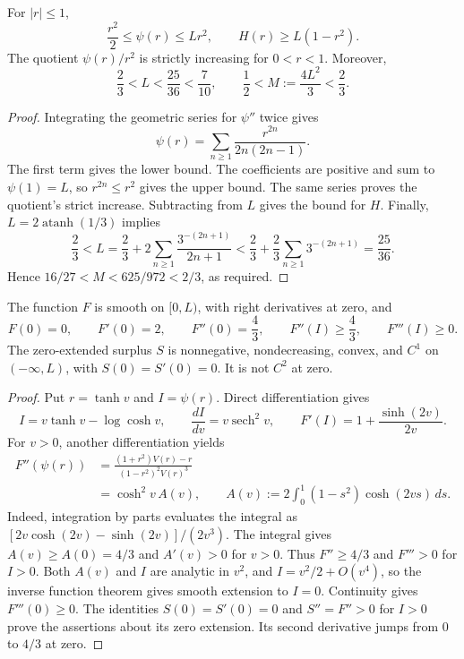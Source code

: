 \begin{lemma}
\label{scalar:entropy-bounds}
For $|r|\le1$,
\begin{equation}
\label{scalar:entropy-quadratic-bounds}
 \frac{r^2}{2}\le\psi(r)\le Lr^2,\qquad H(r)\ge L(1-r^2).
\end{equation}
The quotient $\psi(r)/r^2$ is strictly increasing for $0<r<1$.
Moreover,
\begin{equation}
\label{scalar:logarithm-constants}
 \frac23<L<\frac{25}{36}<\frac7{10},\qquad
 \frac12<M:=\frac{4L^2}{3}<\frac23.
\end{equation}
\end{lemma}
\begin{proof}
Integrating the geometric series for $\psi''$ twice gives
\begin{equation}
\label{scalar:entropy-series}
 \psi(r)=\sum_{n\ge1}\frac{r^{2n}}{2n(2n-1)}.
\end{equation}
The first term gives the lower bound.  The coefficients are positive
and sum to $\psi(1)=L$, so $r^{2n}\le r^2$ gives the upper bound.
The same series proves the quotient's strict increase.
Subtracting from $L$ gives the bound for $H$.
Finally, $L=2\operatorname{atanh}(1/3)$ implies
\[
 \frac23<L
 =\frac23+2\sum_{n\ge1}\frac{3^{-(2n+1)}}{2n+1}
 <\frac23+\frac23\sum_{n\ge1}3^{-(2n+1)}
 =\frac{25}{36}.
\]
Hence $16/27<M<625/972<2/3$, as required.
\end{proof}

\begin{lemma}
\label{scalar:profile-convexity}
The function $F$ is smooth on $[0,L)$, with right derivatives at zero,
and
\begin{equation}
\label{scalar:production-convexity}
 F(0)=0,\qquad F'(0)=2,\qquad F''(0)=\frac43,\qquad
 F''(I)\ge\frac43,\qquad F'''(I)\ge0.
\end{equation}
The zero-extended surplus $S$ is nonnegative, nondecreasing, convex, and
$C^1$ on $(-\infty,L)$, with $S(0)=S'(0)=0$.  It is not $C^2$ at zero.
\end{lemma}
\begin{proof}
Put $r=\tanh v$ and $I=\psi(r)$.  Direct differentiation gives
\[
 I=v\tanh v-\log\cosh v,\qquad
 \frac{dI}{dv}=v\operatorname{sech}^2v,\qquad
 F'(I)=1+\frac{\sinh(2v)}{2v}.
\]
For $v>0$, another differentiation yields
\begin{align}
\label{scalar:production-second-derivative}
 F''(\psi(r))
 &=\frac{(1+r^2)V(r)-r}{(1-r^2)^2V(r)^3}\\
 &=\cosh^2v\,A(v),\qquad
 A(v):=2\int_0^1(1-s^2)\cosh(2vs)\,ds.
\label{scalar:production-positive-series}
\end{align}
Indeed, integration by parts evaluates the integral as
$[2v\cosh(2v)-\sinh(2v)]/(2v^3)$.
The integral gives $A(v)\ge A(0)=4/3$ and $A'(v)>0$ for $v>0$.
Thus $F''\ge4/3$ and $F'''>0$ for $I>0$.
Both $A(v)$ and $I$ are analytic in $v^2$, and
$I=v^2/2+O(v^4)$, so the inverse function theorem gives smooth
extension to $I=0$.  Continuity gives $F'''(0)\ge0$.
The identities $S(0)=S'(0)=0$ and $S''=F''>0$ for $I>0$
prove the assertions about its zero extension.  Its second derivative
jumps from $0$ to $4/3$ at zero.
\end{proof}

